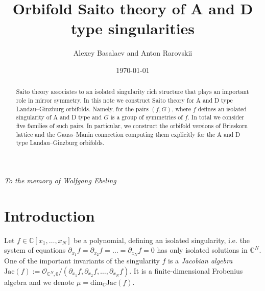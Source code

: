 \documentclass[reqno,12pt]{amsart}
\numberwithin{equation}{section}
\theoremstyle{plain}
\theoremstyle{definition}
\newcommand{\CC}{{\mathbb{C}}}
\newcommand{\Jac}{\mathrm{Jac}}
\def\O{{\mathcal O}}
\numberwithin{equation}{section}
\begin{document}
\title{
Orbifold Saito theory of A and D type singularities
}

\author{Alexey Basalaev and Anton Rarovskii}
\address{
A.B.: Faculty of Mathematics, HSE University, Usacheva str., 6, 119048 Moscow, Russian Federation,
\newline
A.R.: Faculty of Mathematics, HSE University, Usacheva str., 6, 119048 Moscow, Russian Federation 
and 
Center for Advanced Studies, Skoltech, Bolshoy Boulevard 30 bld. 1, 121205 Moscow, Russian Federation
}

\date{\today}

 \maketitle

 \begin{flushright}
{\it To the memory of Wolfgang Ebeling}
\end{flushright}

 \begin{abstract}
 Saito theory associates to an isolated singularity rich structure that plays an important role in mirror symmetry. In this note we construct Saito theory for A and D type Landau--Ginzburg orbifolds. Namely, for the pairs $(f,G)$, where $f$ defines an isolated singularity of A and D type and $G$ is a group of symmetries of $f$. In total we consider five families of such pairs.
 In particular, we construct the orbifold versions of Brieskorn lattice and the Gauss--Manin connection computing them explicitly for the A and D type Landau--Ginzburg orbifolds.
\end{abstract}




\section{Introduction}
Let $f \in \CC[x_1, \dots, x_N]$ be a polynomial, defining an isolated singularity, i.e. the system of equations $\partial_{x_1}f = \partial_{x_2}f = \dots = \partial_{x_N}f = 0$ has only isolated solutions in $\CC^N$. 
One of the important invariants of the singularity $f$ is a \emph{Jacobian algebra} $\Jac(f) := \O_{\CC^N,0}/(\partial_{x_1}f, \partial_{x_2}f, \dots, \partial_{x_N}f)$. It is a finite-dimensional Frobenius algebra and we denote $\mu = \text{dim}_\CC\Jac(f)$. 
\end{document}
